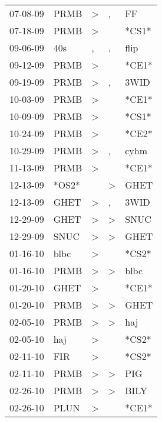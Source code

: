 \begin{supertabular}{lllll}
 07-08-09 &   PRMB &     \textgreater &                , &     FF \\
 07-18-09 &   PRMB &     \textgreater &                  &  *CS1* \\
 09-06-09 &    40s &                , &                , &   flip \\
 09-12-09 &   PRMB &     \textgreater &                  &  *CE1* \\
 09-19-09 &   PRMB &     \textgreater &                , &   3WID \\
 10-03-09 &   PRMB &     \textgreater &                  &  *CE1* \\
 10-09-09 &   PRMB &     \textgreater &                  &  *CS1* \\
 10-24-09 &   PRMB &     \textgreater &                  &  *CE2* \\
 10-29-09 &   PRMB &     \textgreater &                , &   cyhm \\
 11-13-09 &   PRMB &     \textgreater &                  &  *CE1* \\
 12-13-09 &  *OS2* &                  &     \textgreater &   GHET \\
 12-13-09 &   GHET &     \textgreater &                , &   3WID \\
 12-29-09 &   GHET &     \textgreater &     \textgreater &   SNUC \\
 12-29-09 &   SNUC &     \textgreater &     \textgreater &   GHET \\
 01-16-10 &   blbc &     \textgreater &                  &  *CS2* \\
 01-16-10 &   PRMB &     \textgreater &     \textgreater &   blbc \\
 01-20-10 &   GHET &     \textgreater &                  &  *CE1* \\
 01-20-10 &   PRMB &     \textgreater &     \textgreater &   GHET \\
 02-05-10 &   PRMB &     \textgreater &     \textgreater &    haj \\
 02-05-10 &    haj &     \textgreater &                  &  *CS2* \\
 02-11-10 &    FIR &     \textgreater &                  &  *CS2* \\
 02-11-10 &   PRMB &     \textgreater &     \textgreater &    PIG \\
 02-26-10 &   PRMB &     \textgreater &     \textgreater &   BILY \\
 02-26-10 &   PLUN &     \textgreater &                  &  *CE1* \\

\end{supertabular}
